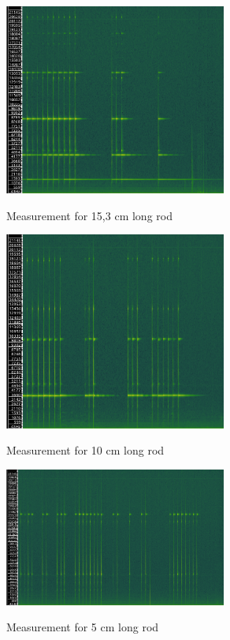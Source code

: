\documentclass[10pt,a4paper]{article}
\begin{document}
\begin{figure}[H]
\centering
    \includegraphics[width=0.65\textwidth]{prvni.png}
    \label{fig:uvod}
    \caption{Measurement for 15,3 cm long rod}
\end{figure}


\begin{figure}[H]
\centering
    \includegraphics[width=0.65\textwidth]{druhy.png}
    \label{fig:uvod}
    \caption{Measurement for 10 cm long rod}
\end{figure}


\begin{figure}[H]
\centering
    \includegraphics[width=0.65\textwidth]{treti.png}
    \label{fig:uvod}
    \caption{Measurement for 5 cm long rod}
\end{figure}
\end{document}

